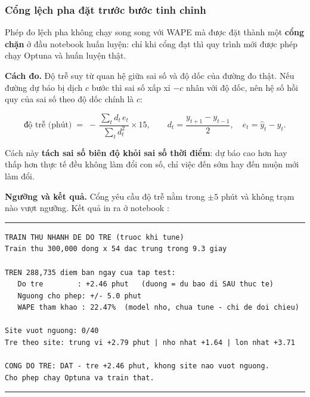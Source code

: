 \documentclass[12pt,a4paper]{article}
\DeclareRobustCommand{\tep}[1]{\texttt{\detokenize{#1}}}
\renewcommand{\baselinestretch}{1.35}
\begin{document}
\subsubsection{Cổng lệch pha đặt trước bước tinh chỉnh}

Phép đo lệch pha không chạy song song với WAPE mà được đặt thành một \textbf{cổng chặn} ở
đầu notebook huấn luyện: chỉ khi cổng đạt thì quy trình mới được phép chạy Optuna và huấn
luyện thật.

\textbf{Cách đo.} Độ trễ suy từ quan hệ giữa sai số và độ dốc của đường đo thật. Nếu đường
dự báo bị dịch $c$ bước thì sai số xấp xỉ $-c$ nhân với độ dốc, nên hệ số hồi quy của sai số
theo độ dốc chính là $c$:

\begin{equation}
\text{độ trễ (phút)} \;=\; -\,\frac{\sum_t d_t \, e_t}{\sum_t d_t^{2}} \times 15,
\qquad
d_t = \frac{y_{t+1} - y_{t-1}}{2}, \quad e_t = \hat{y}_t - y_t .
\end{equation}

Cách này \textbf{tách sai số biên độ khỏi sai số thời điểm}: dự báo cao hơn hay thấp hơn thực
tế đều không làm đổi con số, chỉ việc đến sớm hay đến muộn mới làm đổi.

\textbf{Ngưỡng và kết quả.} Cổng yêu cầu độ trễ nằm trong $\pm 5$ phút và không trạm nào vượt
ngưỡng. Kết quả in ra ở notebook \tep{06_1_train_mae}:

\begingroup
\par\vspace{6pt}\hrule\vspace{4pt}
\small\renewcommand{\baselinestretch}{1.0}\selectfont
\begin{verbatim}
TRAIN THU NHANH DE DO TRE (truoc khi tune)
Train thu 300,000 dong x 54 dac trung trong 9.3 giay

TREN 288,735 diem ban ngay cua tap test:
   Do tre        : +2.46 phut   (duong = du bao di SAU thuc te)
   Nguong cho phep: +/- 5.0 phut
   WAPE tham khao : 22.47%  (model nho, chua tune - chi de doi chieu)

Site vuot nguong: 0/40
Tre theo site: trung vi +2.79 phut | nho nhat +1.64 | lon nhat +3.71

CONG DO TRE: DAT - tre +2.46 phut, khong site nao vuot nguong.
Cho phep chay Optuna va train that.
\end{verbatim}
\vspace{2pt}\hrule\par\vspace{6pt}
\endgroup
\end{document}
